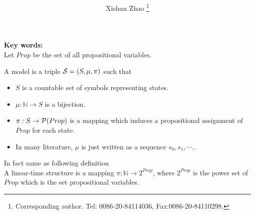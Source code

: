 \documentclass[12pt]{article}
\begin{document}
\title{
}

\author{
Xishun Zhao \footnote{Corresponding author. Tel: 0086-20-84114036,
Fax:0086-20-84110298.}
}





\maketitle

\begin{abstract}

\end{abstract}




{\bf Key words:} \\

Let $Prop$ be the set of all propositional variables.
\vskip 2mm

A model
is a triple
${\cal S}=(S,\mu,\pi)$ such that
\begin{itemize}
\item $S$ is a countable set of symbols representing states.
\item $\mu: \mathbb{N}\rightarrow S$ is a bijection.
\item $\pi: S\rightarrow {\cal P}(Prop)$ is a mapping which induces a propositional assignment of $Prop$ for each state.
\item In many literature, $\mu$ is just written as a sequence $s_0,s_1,\cdots,$.
\end{itemize}


In fact same as following definition\\

A linear-time structure is a mapping $\pi:\mathbb{N}\rightarrow 2^{Prop}$, where $2^{Prop}$ is the power set of $Prop$ which is the set propositional variables. \\
\end{document}
